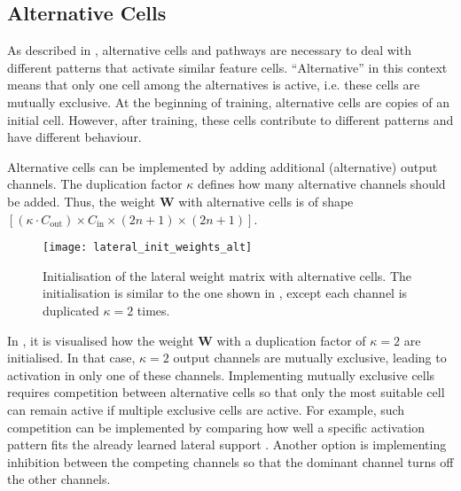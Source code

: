 \subsection{Alternative Cells}
As described in , alternative cells and pathways are necessary to deal with different patterns that activate similar feature cells.
``Alternative'' in this context means that only one cell among the alternatives is active, i.e. these cells are mutually exclusive.
At the beginning of training, alternative cells are copies of an initial cell.
However, after training, these cells contribute to different patterns and have different behaviour.

Alternative cells can be implemented by adding additional (alternative) output channels.
The duplication factor $\kappa$ defines how many alternative channels should be added.
Thus, the weight $\boldsymbol{W}$ with alternative cells is of shape $\left[(\kappa \cdot C_{\text{out}}) \times C_{\text{in}} \times (2n+1) \times (2n+1)\right]$.

\begin{figure}[h]
    \centering
    \texttt{[image: lateral\_init\_weights\_alt]}
    \caption[Initialisation of the lateral weight matrix with alternative cells]{Initialisation of the lateral weight matrix with alternative cells. The initialisation is similar to the one shown in , except each channel is duplicated $\kappa=2$ times.}
\end{figure}

In , it is visualised how the weight $\boldsymbol{W}$ with a duplication factor of $\kappa=2$ are initialised.
In that case, $\kappa=2$ output channels are mutually exclusive, leading to activation in only one of these channels.
Implementing mutually exclusive cells requires competition between alternative cells  so that only the most suitable cell can remain active if multiple exclusive cells are active.
For example, such competition can be implemented by comparing how well a specific activation pattern fits the already learned lateral support \cite{vogels_inhibitory_2011, joshi_rules_2009, teichmann_intrinsic_2015}.
Another option is implementing inhibition between the competing channels so that the dominant channel turns off the other channels.


